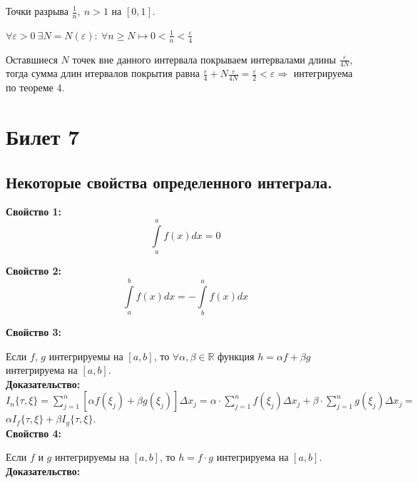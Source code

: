 \documentclass[a4paper,12pt]{article} %
\begin{document}
Точки разрыва $\frac{1}{n},~n>1$ на $[0,1]$.

$\forall\varepsilon>0~\exists N=N(\varepsilon):~\forall n\geq N\longmapsto 0<\frac{1}{n}<\frac{\varepsilon}{4}$

Оставшиеся $N$ точек вне данного интервала покрываем интервалами длины $\frac{\varepsilon}{4N}$, тогда сумма длин итервалов покрытия равна $\frac{\varepsilon}{4}+N\frac{\varepsilon}{4N}=\frac{\varepsilon}{2}<\varepsilon\Rightarrow$ интегрируема по теореме 4.



\section{Билет 7}

\subsection{Некоторые свойства определенного интеграла.}

\textbf{Свойство 1:}
$$\int \limits_a^a f(x)dx = 0$$

\textbf{Свойство 2:}
$$\int \limits_a^b f(x)dx = -\int \limits_b^a f(x)dx$$

\textbf{Свойство 3:}

Если $ f $, $ g $ интегрируемы на $ [a, b] $, то $\forall{\alpha, \beta} \in \mathbb{R} $ функция $ h = \alpha f + \beta g $ интегрируема на $ [a, b] $.\\

\textbf{Доказательство:} \\[5 mm]
$ I_n \{ \tau, \xi \} = \sum\limits_{j = 1}^n   [\alpha f(\xi_j) + \beta g(\xi_j)] \Delta x_j  =  \alpha \cdot \sum\limits_{j = 1}^n f(\xi_j)\Delta x_j + \beta \cdot \sum\limits_{j = 1}^n g(\xi_j)\Delta x_j = $ \\ [2 mm] $ \alpha I_f \{\tau, \xi \} + \beta I_g \{\tau, \xi \} $.\\

\textbf{Свойство 4:}

Если $ f $ и $ g $ интегрируемы на $ [a, b] $, то $ h = f \cdot g $ интегрируема на $ [a, b] $.\\

\textbf{Доказательство:}
\end{document}
